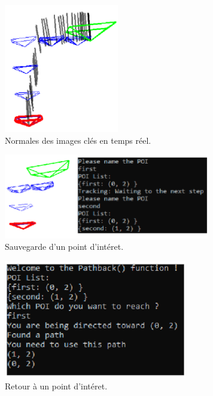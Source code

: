 \documentclass[11pt]{article}
\begin{document}
        \begin{figure}[hbt]  
          \centering
          \includegraphics[width=50mm]{Test2.png}    
          \caption{Normales des images clés en temps réel.}
          \label{fig:Test2}
        \end{figure} 

        \begin{figure}[hbt]  
          \centering
          \includegraphics[width=90mm]{Test3.png}    
          \caption{Sauvegarde d'un point d'intéret.}
          \label{fig:Test3}
        \end{figure} 

        \begin{figure}[hbt]  
          \centering
          \includegraphics[width=80mm]{Test4.png}    
          \caption{Retour à un point d'intéret.}
          \label{fig:Test4}
        \end{figure}    
        
        
      \pagebreak
\end{document}
